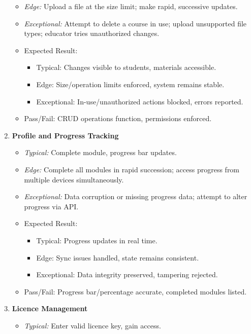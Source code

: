 \documentclass[a4paper,11pt]{scrartcl}
\begin{document}
\begin{enumerate}[leftmargin=*]
\begin{itemize}
            \item \emph{Edge:} Upload a file at the size limit; make rapid, successive updates.
            \item \emph{Exceptional:} Attempt to delete a course in use; upload unsupported file types; educator tries unauthorized changes.
            \item Expected Result:
                \begin{itemize}
                  \item Typical: Changes visible to students, materials accessible.
                  \item Edge: Size/operation limits enforced, system remains stable.
                  \item Exceptional: In-use/unauthorized actions blocked, errors reported.
                \end{itemize}
            \item Pass/Fail: CRUD operations function, permissions enforced.
        \end{itemize}
    \item \textbf{Profile and Progress Tracking}
        \begin{itemize}
            \item \emph{Typical:} Complete module, progress bar updates.
            \item \emph{Edge:} Complete all modules in rapid succession; access progress from multiple devices simultaneously.
            \item \emph{Exceptional:} Data corruption or missing progress data; attempt to alter progress via API.
            \item Expected Result:
                \begin{itemize}
                  \item Typical: Progress updates in real time.
                  \item Edge: Sync issues handled, state remains consistent.
                  \item Exceptional: Data integrity preserved, tampering rejected.
                \end{itemize}
            \item Pass/Fail: Progress bar/percentage accurate, completed modules listed.
        \end{itemize}
    \item \textbf{Licence Management}
        \begin{itemize}
            \item \emph{Typical:} Enter valid licence key, gain access.

\end{itemize}
\end{enumerate}
\end{document}
